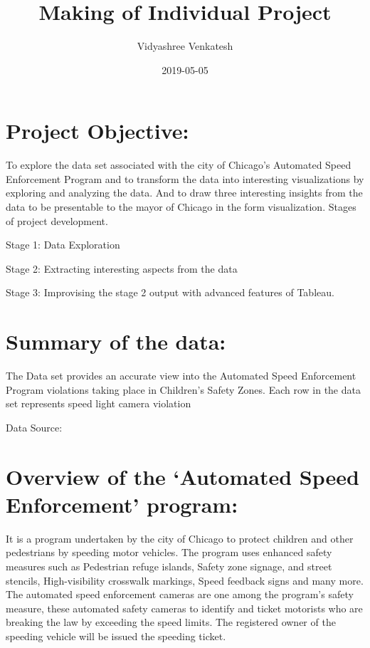 \documentclass[]{book}
\title{Making of Individual Project}
\author{Vidyashree Venkatesh}
\date{2019-05-05}
\begin{document}
\maketitle

{
\setcounter{tocdepth}{1}
\tableofcontents
}
\hypertarget{project-objective}{%
\chapter{Project Objective:}\label{project-objective}}

To explore the data set associated with the city of Chicago's Automated Speed Enforcement Program and to transform the data into interesting visualizations by exploring and analyzing the data. And to draw three interesting insights from the data to be presentable to the mayor of Chicago in the form visualization. Stages of project development.

Stage 1: Data Exploration

Stage 2: Extracting interesting aspects from the data

Stage 3: Improvising the stage 2 output with advanced features of Tableau.

\hypertarget{summary-of-the-data}{%
\chapter{Summary of the data:}\label{summary-of-the-data}}

The Data set provides an accurate view into the Automated Speed Enforcement Program violations taking place in Children's Safety Zones.
Each row in the data set represents speed light camera violation

Data Source: \citep{data}

\hypertarget{overview-of-the-automated-speed-enforcement-program}{%
\chapter{Overview of the `Automated Speed Enforcement' program:}\label{overview-of-the-automated-speed-enforcement-program}}

It is a program undertaken by the city of Chicago to protect children and other pedestrians by speeding motor vehicles. The program uses enhanced safety measures such as Pedestrian refuge islands, Safety zone signage, and street stencils, High-visibility crosswalk markings, Speed feedback signs and many more. The automated speed enforcement cameras are one among the program's safety measure, these automated safety cameras to identify and ticket motorists who are breaking the law by exceeding the speed limits. The registered owner of the speeding vehicle will be issued the speeding ticket.
\citep{program}
\end{document}
